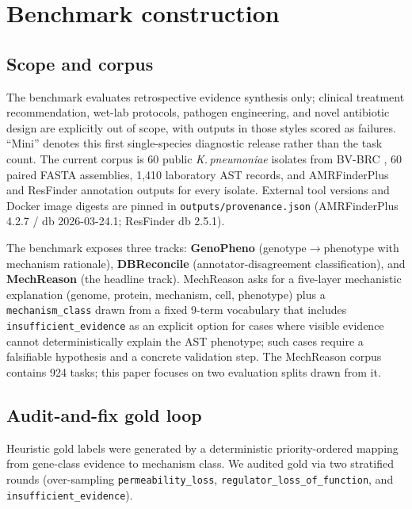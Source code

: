 \documentclass{article}
\begin{document}
\section{Benchmark construction}
\label{sec:bench}

\subsection{Scope and corpus}

The benchmark evaluates retrospective evidence synthesis only; clinical
treatment recommendation, wet-lab protocols, pathogen engineering, and novel
antibiotic design are explicitly out of scope, with outputs in those styles
scored as failures. ``Mini'' denotes this first single-species diagnostic
release rather than the task count. The current corpus is 60 public \emph{K.\,pneumoniae}
isolates from BV-BRC \cite{bvbrc}, 60 paired FASTA assemblies, 1{,}410
laboratory AST records, and AMRFinderPlus \cite{amrfinder} and ResFinder
annotation outputs for every isolate. External tool versions and Docker
image digests are pinned in \texttt{outputs/provenance.json}
(AMRFinderPlus 4.2.7 / db 2026-03-24.1; ResFinder db 2.5.1).

The benchmark exposes three tracks: \textbf{GenoPheno}
(genotype$\rightarrow$phenotype with mechanism rationale),
\textbf{DBReconcile} (annotator-disagreement classification), and
\textbf{MechReason} (the headline track). MechReason asks for a five-layer
mechanistic explanation (genome, protein, mechanism, cell, phenotype)
plus a \texttt{mechanism\_class} drawn from a fixed 9-term vocabulary
that includes \texttt{insufficient\_evidence} as an explicit option for
cases where visible evidence cannot deterministically explain the AST
phenotype; such cases require a falsifiable hypothesis and a concrete
validation step. The MechReason corpus contains 924 tasks; this paper
focuses on two evaluation splits drawn from it.

\subsection{Audit-and-fix gold loop}
\label{sec:audit}

Heuristic gold labels were generated by a deterministic priority-ordered
mapping from gene-class evidence to mechanism class. We audited gold via two
stratified rounds (over-sampling \texttt{permeability\_loss},
\texttt{regulator\_loss\_of\_function}, and \texttt{insufficient\_evidence}).
\end{document}
